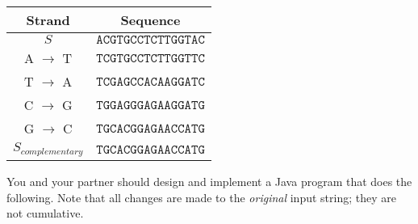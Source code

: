 \begin{center}

\begin{tabular}{|cc|}
\hline
\textbf{Strand} & \textbf{Sequence}\\
\hline\hline
$S$      & $\mathtt{ACGTGCCTCTTGGTAC}$ \\
\hline
A $\to$ T &  $\mathtt{TCGTGCCTCTTGGTTC}$ \\
T $\to$ A &  $\mathtt{TCGAGCCACAAGGATC}$ \\
C $\to$ G &  $\mathtt{TGGAGGGAGAAGGATG}$ \\
G $\to$ C &  $\mathtt{TGCACGGAGAACCATG}$ \\
\hline
$S_{complementary}$ &  $\mathtt{TGCACGGAGAACCATG}$ \\
\hline
\end{tabular}
\end{center}

You and your partner should design and implement a Java program that does the following.  Note that all changes are made
to the {\em original} input string; they are not cumulative.

